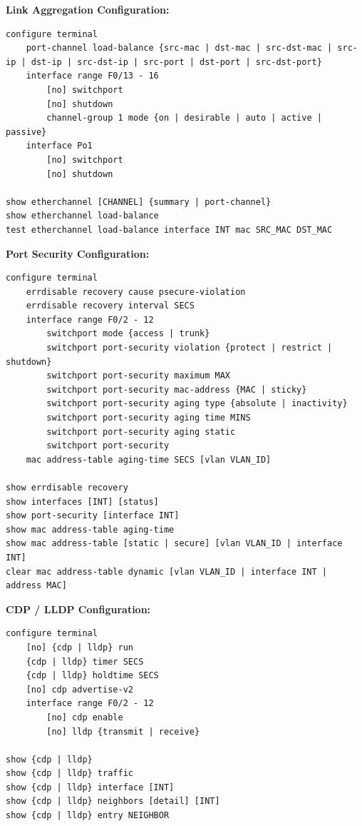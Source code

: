 \documentclass[12pt]{article}
\begin{document}
	\textbf{Link Aggregation Configuration:}
	\begin{lstlisting}
configure terminal
	port-channel load-balance {src-mac | dst-mac | src-dst-mac | src-ip | dst-ip | src-dst-ip | src-port | dst-port | src-dst-port}
	interface range F0/13 - 16
		[no] switchport
		[no] shutdown
		channel-group 1 mode {on | desirable | auto | active | passive}
	interface Po1
		[no] switchport
		[no] shutdown

show etherchannel [CHANNEL] {summary | port-channel}
show etherchannel load-balance
test etherchannel load-balance interface INT mac SRC_MAC DST_MAC
	\end{lstlisting}

	\textbf{Port Security Configuration:}
	\begin{lstlisting}
configure terminal
	errdisable recovery cause psecure-violation
	errdisable recovery interval SECS
	interface range F0/2 - 12
		switchport mode {access | trunk}
		switchport port-security violation {protect | restrict | shutdown}
		switchport port-security maximum MAX
		switchport port-security mac-address {MAC | sticky}
		switchport port-security aging type {absolute | inactivity}
		switchport port-security aging time MINS
		switchport port-security aging static
		switchport port-security
	mac address-table aging-time SECS [vlan VLAN_ID]

show errdisable recovery
show interfaces [INT] [status]
show port-security [interface INT]
show mac address-table aging-time
show mac address-table [static | secure] [vlan VLAN_ID | interface INT]
clear mac address-table dynamic [vlan VLAN_ID | interface INT | address MAC]
	\end{lstlisting}

	\textbf{CDP / LLDP Configuration:}
	\begin{lstlisting}
configure terminal
	[no] {cdp | lldp} run
	{cdp | lldp} timer SECS
	{cdp | lldp} holdtime SECS
	[no] cdp advertise-v2
	interface range F0/2 - 12
		[no] cdp enable
		[no] lldp {transmit | receive}

show {cdp | lldp}
show {cdp | lldp} traffic
show {cdp | lldp} interface [INT]
show {cdp | lldp} neighbors [detail] [INT]
show {cdp | lldp} entry NEIGHBOR
	\end{lstlisting}
\end{document}

